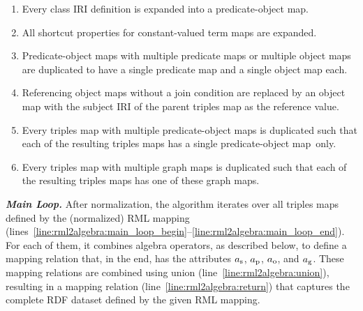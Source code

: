 \begin{enumerate}
	\item
	\label{item:NormalizationStep:ClassExpansion}
	Every class IRI definition is expanded into a predicate-object map.

	\item
	\label{item:NormalizationStep:ConstantsExpansion}
	All shortcut properties for constant-valued term maps are expanded.

	\item
	\label{item:NormalizationStep:POMDuplication}
	Predicate-object maps with multiple predicate maps or multiple object maps are duplicated to have a single predicate map and a single object map each.

	\item
	\label{item:NormalizationStep:JoinRemoval}
	Referencing object maps without a join condition are replaced by an object map with the subject IRI of the parent triples map as the reference value.

	\item
	\label{item:NormalizationStep:TMDuplication1}
	Every triples map with multiple predicate-object maps is duplicated such that each of the resulting triples maps has a single predicate-object map~only.

	\item
	\label{item:NormalizationStep:TMDuplication2}
	Every triples map with multiple graph maps is duplicated such that each of the resulting triples maps has one of these graph maps.
\end{enumerate}

\noindent\textbf{\itshape Main Loop.}
After normalization, the algorithm iterates over all triples maps defined by the (normalized) RML mapping (lines~\ref{line:rml2algebra:main_loop_begin}--\ref{line:rml2algebra:main_loop_end}). For each of them, it
	combines algebra operators, as described below, to define a mapping relation that, in the end, has the attributes $a_\textrm{s}$, $a_\textrm{p}$, $a_\textrm{o}$, and $a_\textrm{g}$.
These mapping relations are combined using union (line~\ref{line:rml2algebra:union}), resulting in a mapping relation (line~\ref{line:rml2algebra:return})
	that captures the complete RDF dataset defined by the given RML mapping.

